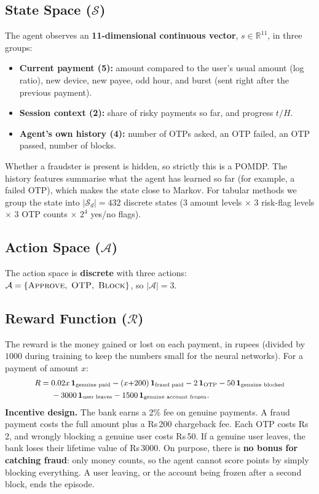 \documentclass[10pt,twocolumn]{article}
\begin{document}
\subsection{State Space ($\mathcal{S}$)}
The agent observes an \textbf{11-dimensional continuous vector}, $s\in\mathbb{R}^{11}$, in three groups:
\begin{itemize}
\item \textbf{Current payment (5):} amount compared to the user's usual amount (log ratio), new device,
new payee, odd hour, and burst (sent right after the previous payment).
\item \textbf{Session context (2):} share of risky payments so far, and progress $t/H$.
\item \textbf{Agent's own history (4):} number of OTPs asked, an OTP failed, an OTP passed, number of blocks.
\end{itemize}
Whether a fraudster is present is hidden, so strictly this is a POMDP. The history features summarise what the
agent has learned so far (for example, a failed OTP), which makes the state close to Markov.
For tabular methods we group the state into $|\mathcal{S}_d|{=}432$ discrete states
($3$ amount levels $\times$ $3$ risk-flag levels $\times$ $3$ OTP counts $\times$ $2^4$ yes/no flags).

\subsection{Action Space ($\mathcal{A}$)}
The action space is \textbf{discrete} with three actions:
$\mathcal{A}=\{\textsc{Approve},\ \textsc{OTP},\ \textsc{Block}\}$, so $|\mathcal{A}|{=}3$.

\subsection{Reward Function ($\mathcal{R}$)}
The reward is the money gained or lost on each payment, in rupees (divided by $1000$ during training to keep
the numbers small for the neural networks). For a payment of amount $x$:
\begin{equation*}\small
\begin{aligned}
R ={}& 0.02x\,\mathbf{1}_{\text{genuine paid}} - (x{+}200)\,\mathbf{1}_{\text{fraud paid}}
 - 2\,\mathbf{1}_{\text{OTP}} - 50\,\mathbf{1}_{\text{genuine blocked}}\\
&- 3000\,\mathbf{1}_{\text{user leaves}} - 1500\,\mathbf{1}_{\text{genuine account frozen}}.
\end{aligned}
\end{equation*}
\textbf{Incentive design.} The bank earns a 2\% fee on genuine payments. A fraud payment costs the full amount
plus a Rs\,200 chargeback fee. Each OTP costs Rs\,2, and wrongly blocking a genuine user costs Rs\,50.
If a genuine user leaves, the bank loses their lifetime value of Rs\,3000. On purpose, there is
\textbf{no bonus for catching fraud}: only money counts, so the agent cannot score points by simply blocking
everything. A user leaving, or the account being frozen after a second block, ends the episode.
\end{document}
